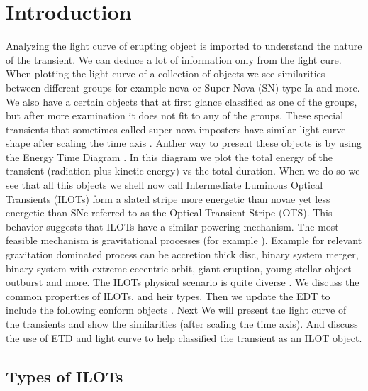 \documentclass[modern]{aastex63}
\begin{document}
\section{Introduction} \label{sec:intro}
Analyzing the light curve of erupting object is imported to understand the nature of the transient.
We can deduce a lot of information only from the light cure.
When plotting the light curve of a collection of objects we see similarities between different groups for example nova or Super Nova (SN) type Ia and more.
We also have a certain objects that at first glance classified as one of the groups, but after more examination it does not fit to any of the groups.
These special transients that sometimes called super nova imposters have similar light curve shape after scaling the time axis \citep{2010ApJ...709L..11K}.
Anther way to present these objects is by using the Energy Time Diagram \citep[ETD; ][]{2010arXiv1011.1222K}.
In this diagram we plot the total energy of the transient (radiation plus kinetic energy) vs the total duration.
When we do so we see that all this objects we shell now call Intermediate Luminous Optical Transients (ILOTs) form a slated stripe more energetic than novae yet less energetic than SNe referred to as the Optical Transient Stripe (OTS).
This behavior suggests that ILOTs have a similar powering mechanism. 
The most feasible mechanism is gravitational processes (for example \citealt{2016RAA....16...99K}).
Example for relevant gravitation dominated process can be accretion thick disc, binary system merger, binary system with extreme eccentric orbit, giant eruption, young stellar object outburst and more.
The ILOTs physical scenario is quite diverse \citep{2018Galax...6...82K}.
We discuss the common properties of ILOTs, and heir types.
Then we update the EDT to include the following conform objects \cite{2016ApJ...826..191H,2018MNRAS.480.3424C,2018MNRAS.473.4805K,2019A&A...632L...6C,2019A&A...625L...8P,2019ApJ...880L..20J,2019ApJ...887..169H,2019Galax...8....2K,2019A&A...621A..30S,2020MNRAS.492.5897S}.
Next We will present the light curve of the transients and show the similarities (after scaling the time axis).
And discuss the use of ETD and light curve to help classified the transient as an ILOT object.

\subsection{Types of ILOTs \label{subsec:Types of ILOTs}}
\end{document}
